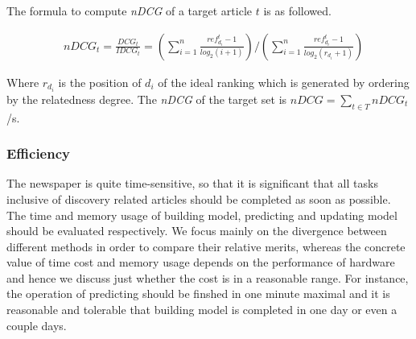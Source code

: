 The formula to compute \textit{nDCG} of a target article $t$ is as followed. 

\begin{align}
   & nDCG_t = \frac{DCG_t}{IDCG_t} = (\sum_{i=1}^n\frac{ref_{d_i}^t-1}{log_2(i+1)})/(\sum_{i=1}^n\frac{ref_{d_i}^t-1}{log_2(r_{d_i}+1)})
\end{align}

Where $r_{d_i}$ is the position of $d_i$ of the ideal ranking which is generated by ordering by the relatedness degree. The \textit{nDCG} of the target set is $nDCG = \sum_{t \in T}nDCG_t$/s.

\subsubsection{Efficiency}

The newspaper is quite time-sensitive, so that it is significant that all tasks inclusive of discovery related articles should be completed as soon as possible. The time and memory usage of building model, predicting and updating model should be evaluated respectively. We focus mainly on the divergence between different methods in order to compare their relative merits, whereas the concrete value of time cost and memory usage depends on the performance of hardware and hence we discuss just whether the cost is in a reasonable range. For instance, the operation of predicting should be finshed in one minute maximal and it is reasonable and tolerable that building model is completed in one day or even a couple days. 
